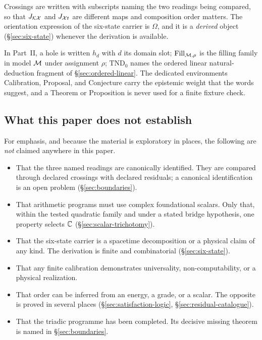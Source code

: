 Crossings are written with subscripts naming the two readings being compared, so
that $J_{\mathcal K\mathcal X}$ and $J_{\mathcal X t}$ are different maps and composition order matters.
The orientation expression of the six-state carrier is $\Omega$, and it is a
\emph{derived} object (\S\ref{sec:six-state}) whenever the derivation is available.

In Part~II, a hole is written $h_d$ with $d$ its domain slot; $\operatorname{Fill}_{\mathcal M,\rho}$ is
the filling family in model $\mathcal M$ under assignment $\rho$; $\mathrm{TND}_0$ names the
ordered linear natural-deduction fragment of \S\ref{sec:ordered-linear}.  The
dedicated environments \textsf{Calibration}, \textsf{Proposal}, and
\textsf{Conjecture} carry the epistemic weight that the words suggest, and a
\textsf{Theorem} or \textsf{Proposition} is never used for a finite fixture check.

\subsection{What this paper does not establish}

For emphasis, and because the material is exploratory in places, the following are
\emph{not} claimed anywhere in this paper.

\begin{itemize}
\item That the three named readings are canonically identified.  They are compared
  through declared crossings with declared residuals; a canonical identification is
  an open problem (\S\ref{sec:boundaries}).
\item That arithmetic programs must use complex foundational scalars.  Only that,
  within the tested quadratic family and under a stated bridge hypothesis, one
  property selects $\mathbb{C}$ (\S\ref{sec:scalar-trichotomy}).
\item That the six-state carrier is a spacetime decomposition or a physical claim of
  any kind.  The derivation is finite and combinatorial (\S\ref{sec:six-state}).
\item That any finite calibration demonstrates universality, non-computability, or a
  physical realization.
\item That order can be inferred from an energy, a grade, or a scalar.  The opposite
  is proved in several places (\S\ref{sec:satisfaction-logic},
  \S\ref{sec:residual-catalogue}).
\item That the triadic programme has been completed.  Its decisive missing theorem
  is named in \S\ref{sec:boundaries}.
\end{itemize}
